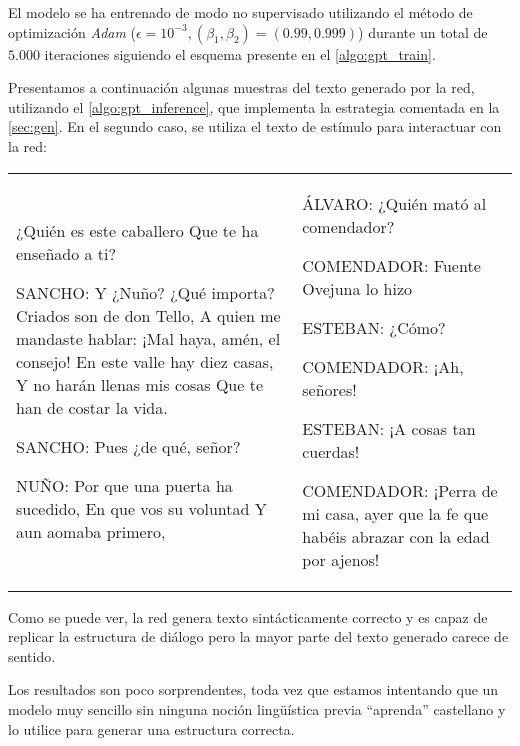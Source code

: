 El modelo se ha entrenado de modo no supervisado utilizando el método de optimización \textit{Adam} (\( \epsilon = 10^{-3}, (\beta_1, \beta_2) = (0.99, 0.999) \)) durante un total de \( 5.000 \) iteraciones siguiendo el esquema presente en el \cref{algo:gpt_train}.

Presentamos a continuación algunas muestras del texto generado por la red, utilizando el \cref{algo:gpt_inference}, que implementa la estrategia comentada en la \cref{sec:gen}. En el segundo caso, se utiliza el texto de estímulo para interactuar con la red: 

\noindent
\begin{table}[H]
  \centering
  \begin{tabular}{ ll }
    \begin{Code}
    ¿Quién es este caballero
    Que te ha enseñado a ti?
    
    SANCHO:
    Y ¿Nuño? ¿Qué importa?
    Criados son de don Tello,
    A quien me mandaste hablar:
    ¡Mal haya, amén, el consejo!
    En este valle hay diez casas,
    Y no harán llenas mis cosas
    Que te han de costar la vida.
    
    SANCHO:
    Pues ¿de qué, señor?

    NUÑO:
    Por que una puerta ha sucedido,
    En que vos su voluntad
    Y aun aomaba primero,
    \end{Code}
    & 
    \begin{Code}
    ÁLVARO:
    ¿Quién mató al comendador?
    
    COMENDADOR:
    Fuente Ovejuna lo hizo
    
    ESTEBAN:
    ¿Cómo?
    
    COMENDADOR:
    ¡Ah, señores!
    
    ESTEBAN:
    ¡A cosas tan cuerdas!

    COMENDADOR:
    ¡Perra de mi casa, ayer
    que la fe que habéis abrazar
    con la edad por ajenos!
    \end{Code}
  \end{tabular}
\end{table}

Como se puede ver, la red genera texto sintácticamente correcto y es capaz de replicar la estructura de diálogo pero la mayor parte del texto generado carece de sentido. 

Los resultados son poco sorprendentes, toda vez que estamos intentando que un modelo  muy sencillo sin ninguna noción lingüística previa ``aprenda'' castellano y lo utilice para generar una estructura correcta. 

